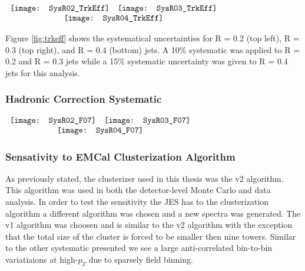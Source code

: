 \begin{figure*}[t!]
$\begin{array}{rl}
    \texttt{[image: SysR02\_TrkEff]} &
    \texttt{[image: SysR03\_TrkEff]}\\
    \multicolumn{2}{c}{\texttt{[image: SysR04\_TrkEff]}}
\end{array}$
\caption[Systematic due to TPC tracking efficiency.]{\label{fig:trkeff}Systematic due to TPC tracking efficiency; R = 0.2 \textit{(top left)}, R = 0.3 \textit{(top right)}, R = 0.4 \textit{(bottom)}.}
\end{figure*}

\noindent
Figure \ref{fig:trkeff} shows the systematical uncertainties for R = 0.2 (top left), R = 0.3 (top right), and R = 0.4 (bottom) jets.  A 10\% systematic was applied to R = 0.2 and R = 0.3 jets while a 15\% systematic uncertainty was given to R = 0.4 jets for this analysis.

\subsubsection{Hadronic Correction Systematic}

\begin{figure*}[t!]
$\begin{array}{rl}
    \texttt{[image: SysR02\_F07]} &
    \texttt{[image: SysR03\_F07]}\\
    \multicolumn{2}{c}{\texttt{[image: SysR04\_F07]}}
\end{array}$
\caption[Systematic due to Hadronic correction.]{\label{fig:hadeff}Systematic due to hadronic correction efficiency; R = 0.2 \textit{(top left)}, R = 0.3 \textit{(top right)}, R = 0.4 \textit{(bottom)}.}
\end{figure*}

\subsubsection{Sensativity to EMCal Clusterization Algorithm}
As previously stated, the clusterizer used in this thesis was the v2 algorithm. This algorithm was used in both the detector-level Monte Carlo and data analysis.  In order to test the sensitivity the JES has to the clusterization algorithm a different algorithm was chosen and a new spectra was generated.  The v1 algorithm was choosen and is similar to the v2 algorithm with the exception that the total size of the cluster is forced to be smaller then nine towers.  Similar to the other systematic presented we see a large anti-correlated bin-to-bin variatiaions at high-$p_{T}$ due to sparsely field binning.  

